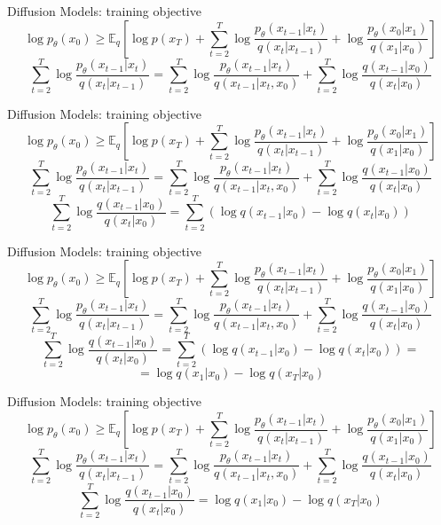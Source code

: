 \documentclass{beamer}
\begin{document}
\begin{frame}[t]{Diffusion Models: training objective \cite{sohldickstein2015deep}}
    $$ \log p_\theta(x_0) \geq \mathbb{E}_q \left[ \log p(x_T) + \sum_{t=2}^T \log \frac{p_\theta(x_{t-1}|x_t)}{q(x_t|x_{t-1})} + \log \frac{p_\theta(x_0|x_1)}{q(x_1|x_0)} \right] $$
    $$ \sum_{t=2}^T \log \frac{p_\theta(x_{t-1}|x_t)}{q(x_t|x_{t-1})} = \sum_{t=2}^T \log \frac{p_\theta(x_{t-1}|x_t)}{q(x_{t-1}|x_t, x_0)} + \sum_{t=2}^T \log \frac{q(x_{t-1}|x_0)}{q(x_t|x_0)} $$
\end{frame}

\begin{frame}[t]{Diffusion Models: training objective \cite{sohldickstein2015deep}}
    $$ \log p_\theta(x_0) \geq \mathbb{E}_q \left[ \log p(x_T) + \sum_{t=2}^T \log \frac{p_\theta(x_{t-1}|x_t)}{q(x_t|x_{t-1})} + \log \frac{p_\theta(x_0|x_1)}{q(x_1|x_0)} \right] $$
    $$ \sum_{t=2}^T \log \frac{p_\theta(x_{t-1}|x_t)}{q(x_t|x_{t-1})} = \sum_{t=2}^T \log \frac{p_\theta(x_{t-1}|x_t)}{q(x_{t-1}|x_t, x_0)} + \sum_{t=2}^T \log \frac{q(x_{t-1}|x_0)}{q(x_t|x_0)} $$
    $$ \sum_{t=2}^T \log \frac{q(x_{t-1}|x_0)}{q(x_t|x_0)} = \sum_{t=2}^T (\log q(x_{t-1}|x_0) - \log q(x_t|x_0)) $$
\end{frame}

\begin{frame}[t]{Diffusion Models: training objective \cite{sohldickstein2015deep}}
    $$ \log p_\theta(x_0) \geq \mathbb{E}_q \left[ \log p(x_T) + \sum_{t=2}^T \log \frac{p_\theta(x_{t-1}|x_t)}{q(x_t|x_{t-1})} + \log \frac{p_\theta(x_0|x_1)}{q(x_1|x_0)} \right] $$
    $$ \sum_{t=2}^T \log \frac{p_\theta(x_{t-1}|x_t)}{q(x_t|x_{t-1})} = \sum_{t=2}^T \log \frac{p_\theta(x_{t-1}|x_t)}{q(x_{t-1}|x_t, x_0)} + \sum_{t=2}^T \log \frac{q(x_{t-1}|x_0)}{q(x_t|x_0)} $$
    $$ \sum_{t=2}^T \log \frac{q(x_{t-1}|x_0)}{q(x_t|x_0)} = \sum_{t=2}^T (\log q(x_{t-1}|x_0) - \log q(x_t|x_0)) = $$
    $$ = \log q(x_1|x_0) - \log q(x_T|x_0) $$
\end{frame}



\begin{frame}[t]{Diffusion Models: training objective \cite{sohldickstein2015deep}}
    $$ \log p_\theta(x_0) \geq \mathbb{E}_q \left[ \log p(x_T) + \sum_{t=2}^T \log \frac{p_\theta(x_{t-1}|x_t)}{q(x_t|x_{t-1})} + \log \frac{p_\theta(x_0|x_1)}{q(x_1|x_0)} \right] $$
    $$ \sum_{t=2}^T \log \frac{p_\theta(x_{t-1}|x_t)}{q(x_t|x_{t-1})} = \sum_{t=2}^T \log \frac{p_\theta(x_{t-1}|x_t)}{q(x_{t-1}|x_t, x_0)} + \sum_{t=2}^T \log \frac{q(x_{t-1}|x_0)}{q(x_t|x_0)} $$
    $$ \sum_{t=2}^T \log \frac{q(x_{t-1}|x_0)}{q(x_t|x_0)} = \log q(x_1|x_0) - \log q(x_T|x_0) $$
\end{frame}
\end{document}
